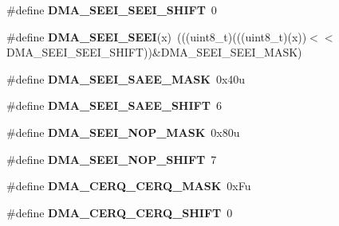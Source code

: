 \begin{DoxyCompactItemize}
\item 
\#define {\bfseries D\+M\+A\+\_\+\+S\+E\+E\+I\+\_\+\+S\+E\+E\+I\+\_\+\+S\+H\+I\+FT}~0\hypertarget{group__DMA__Register__Masks_ga8d58d06faafb79d99b17b5694f3d18e5}{}\label{group__DMA__Register__Masks_ga8d58d06faafb79d99b17b5694f3d18e5}

\item 
\#define {\bfseries D\+M\+A\+\_\+\+S\+E\+E\+I\+\_\+\+S\+E\+EI}(x)~(((uint8\+\_\+t)(((uint8\+\_\+t)(x))$<$$<$D\+M\+A\+\_\+\+S\+E\+E\+I\+\_\+\+S\+E\+E\+I\+\_\+\+S\+H\+I\+FT))\&D\+M\+A\+\_\+\+S\+E\+E\+I\+\_\+\+S\+E\+E\+I\+\_\+\+M\+A\+SK)\hypertarget{group__DMA__Register__Masks_ga5e1057a8a3c0471a410d748cd532cce3}{}\label{group__DMA__Register__Masks_ga5e1057a8a3c0471a410d748cd532cce3}

\item 
\#define {\bfseries D\+M\+A\+\_\+\+S\+E\+E\+I\+\_\+\+S\+A\+E\+E\+\_\+\+M\+A\+SK}~0x40u\hypertarget{group__DMA__Register__Masks_ga2d0a03f5b7e54876cc8a0af2251b1809}{}\label{group__DMA__Register__Masks_ga2d0a03f5b7e54876cc8a0af2251b1809}

\item 
\#define {\bfseries D\+M\+A\+\_\+\+S\+E\+E\+I\+\_\+\+S\+A\+E\+E\+\_\+\+S\+H\+I\+FT}~6\hypertarget{group__DMA__Register__Masks_ga313d9b0f41aebf4cc2f6a5f1f730665b}{}\label{group__DMA__Register__Masks_ga313d9b0f41aebf4cc2f6a5f1f730665b}

\item 
\#define {\bfseries D\+M\+A\+\_\+\+S\+E\+E\+I\+\_\+\+N\+O\+P\+\_\+\+M\+A\+SK}~0x80u\hypertarget{group__DMA__Register__Masks_ga4561a1738dbf8013bd619fad65b0e216}{}\label{group__DMA__Register__Masks_ga4561a1738dbf8013bd619fad65b0e216}

\item 
\#define {\bfseries D\+M\+A\+\_\+\+S\+E\+E\+I\+\_\+\+N\+O\+P\+\_\+\+S\+H\+I\+FT}~7\hypertarget{group__DMA__Register__Masks_ga190051f9e53699e081f1b6f96f6890c8}{}\label{group__DMA__Register__Masks_ga190051f9e53699e081f1b6f96f6890c8}

\item 
\#define {\bfseries D\+M\+A\+\_\+\+C\+E\+R\+Q\+\_\+\+C\+E\+R\+Q\+\_\+\+M\+A\+SK}~0x\+Fu\hypertarget{group__DMA__Register__Masks_ga6c4e980f82778e0191670788d29dcb9e}{}\label{group__DMA__Register__Masks_ga6c4e980f82778e0191670788d29dcb9e}

\item 
\#define {\bfseries D\+M\+A\+\_\+\+C\+E\+R\+Q\+\_\+\+C\+E\+R\+Q\+\_\+\+S\+H\+I\+FT}~0\hypertarget{group__DMA__Register__Masks_gaca402b011bea1924acca0e1e708c6db6}{}\label{group__DMA__Register__Masks_gaca402b011bea1924acca0e1e708c6db6}


\end{DoxyCompactItemize}
